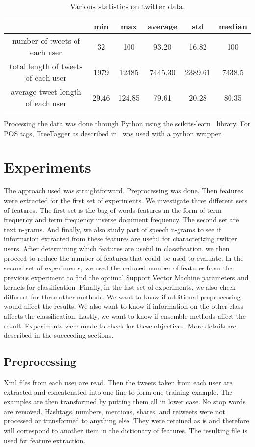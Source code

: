 \documentclass[a4paper]{llncs}
\begin{document}
\begin{table}[!htbp]
\centering
\begin{tabular}{|c|ccccc|}
\hline
                                    & min   & max    & average & std     & median \\ \hline
number of tweets of each user       & 32    & 100    & 93.20   & 16.82   & 100    \\ \hline
total length of tweets of each user & 1979  & 12485  & 7445.30 & 2389.61 & 7438.5 \\ \hline
average tweet length of each user   & 29.46 & 124.85 & 79.61   & 20.28   & 80.35  \\ \hline
\end{tabular}
\caption{Various statistics on twitter data.}
\label{table:TweetStats}
\end{table}

Processing the data was done through Python using the scikits-learn~\cite{scikit-learn} library. For POS tags, TreeTagger as described in~\cite{schmid1994probabilistic} was used with a python wrapper.
\section{Experiments}
The approach used was straightforward. Preprocessing was done. Then features were extracted for the first set of experiments. We investigate three different sets of features. The first set is the bag of words features in the form of term frequency and term frequency inverse document frequency. The second set are text n-grams. And finally, we also study part of speech n-grams to see if information extracted from these features are useful for characterizing twitter users. After determining which features are useful in classification, we then proceed to reduce the number of features that could be used to evaluate. In the second set of experiments, we used the reduced number of features from the previous experiment to find the optimal Support Vector Machine parameters and kernels for classification. Finally, in the last set of experiments, we also check different for three other methods. We want to know if additional preprocessing would affect the results. We also want to know if information on the other class affects the classification. Lastly, we want to know if ensemble methods affect the result. Experiments were made to check for these objectives. More details are described in the succeeding sections.


\subsection{Preprocessing}
Xml files from each user are read. Then the tweets taken from each user are extracted and concatenated into one line to form one training example. The examples are then transformed by putting them all in lower case. No stop words are removed. Hashtags, numbers, mentions, shares, and retweets were not processed or transformed to anything else. They were retained as is and therefore will correspond to another item in the dictionary of features. The resulting file is used for feature extraction.  
\end{document}
